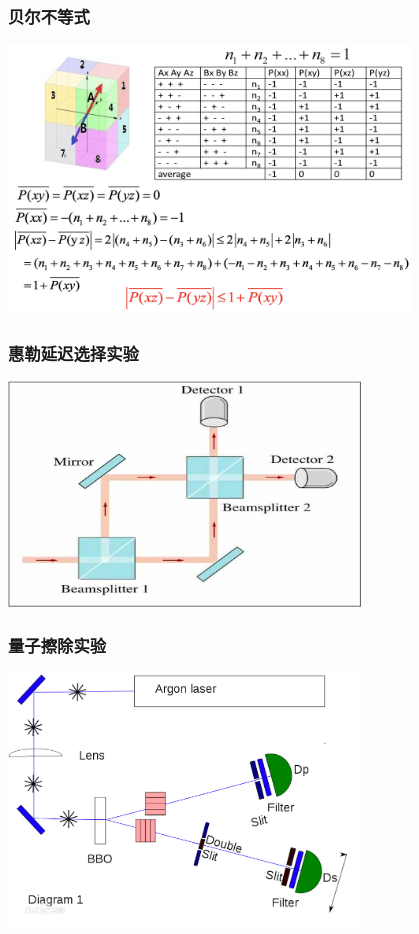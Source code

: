 \begin{frame}
    \frametitle{贝尔不等式}
    \begin{center}
        \includegraphics[width=0.8\textwidth]{figs/bell.png} \\
    \end{center} 
\end{frame}

\begin{frame}
    \frametitle{惠勒延迟选择实验}
    \begin{center}
        \includegraphics[width=0.7\textwidth]{figs/choose.png} \\
    \end{center} 
\end{frame}

\begin{frame}
    \frametitle{量子擦除实验}
    \begin{center}
        \includegraphics[width=0.7\textwidth]{figs/c1.png} \\
    \end{center} 
\end{frame}


